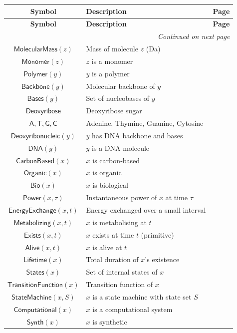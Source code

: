 \documentclass{amsart}
\newenvironment{glossarytable}{%
	\renewcommand{\arraystretch}{1.3}%
	\setlength{\tabcolsep}{4pt}%
	\begin{longtable}{|c|l|c|}
		\hline
		\textbf{Symbol} & \textbf{Description} & \textbf{Page} \\
		\hline
		\endfirsthead
		\hline
		\textbf{Symbol} & \textbf{Description} & \textbf{Page} \\
		\hline
		\endhead
		\hline
		\multicolumn{3}{r}{\textit{Continued on next page}} \\
		\endfoot
		\hline
		\endlastfoot
	}{%
	\end{longtable}%
}
\theoremstyle{break}
\newcommand{\IsBiological}[1]{\mathsf{Bio}(#1)}
\newcommand{\IsSynthetic}[1]{\mathsf{Synth}(#1)}
\begin{document}
\begin{glossarytable}
	$\mathsf{MolecularMass}(z)$ & Mass of molecule $z$ (Da) & \pageref{def:molecularmass} \\
	$\mathsf{Monomer}(z)$ & $z$ is a monomer & \pageref{def:monomer} \\
	$\mathsf{Polymer}(y)$ & $y$ is a polymer & \pageref{def:polymer} \\
	$\mathsf{Backbone}(y)$ & Molecular backbone of $y$ & \pageref{def:backbone} \\
	$\mathsf{Bases}(y)$ & Set of nucleobases of $y$ & \pageref{def:bases} \\
	$\mathsf{Deoxyribose}$ & Deoxyribose sugar & \pageref{def:deoxyribose} \\
	$\mathsf{A},\mathsf{T},\mathsf{G},\mathsf{C}$ & Adenine, Thymine, Guanine, Cytosine & \pageref{def:adenine} \\
	$\mathsf{Deoxyribonucleic}(y)$ & $y$ has DNA backbone and bases & \pageref{def:deoxyribonucleic} \\
	$\mathsf{DNA}(y)$ & $y$ is a DNA molecule & \pageref{def:dna} \\
	
	$\mathsf{CarbonBased}(x)$ & $x$ is carbon‑based & \pageref{def:carbonbased} \\
	$\mathsf{Organic}(x)$ & $x$ is organic & \pageref{def:organic} \\
	$\IsBiological{x}$ & $x$ is biological & \pageref{def:bio} \\
	
	$\mathsf{Power}(x,\tau)$ & Instantaneous power of $x$ at time $\tau$ & \pageref{def:power} \\
	$\mathsf{EnergyExchange}(x,t)$ & Energy exchanged over a small interval & \pageref{def:energyexchange} \\
	$\mathsf{Metabolizing}(x,t)$ & $x$ is metabolising at $t$ & \pageref{def:metabolizing} \\
	$\mathsf{Exists}(x,t)$ & $x$ exists at time $t$ (primitive) & \pageref{def:exists} \\
	$\mathsf{Alive}(x,t)$ & $x$ is alive at $t$ & \pageref{def:alive} \\
	$\mathsf{Lifetime}(x)$ & Total duration of $x$'s existence & \pageref{def:lifetime} \\
	
	$\mathsf{States}(x)$ & Set of internal states of $x$ & \pageref{def:states} \\
	$\mathsf{TransitionFunction}(x)$ & Transition function of $x$ & \pageref{def:transitionfunction} \\
	$\mathsf{StateMachine}(x,S)$ & $x$ is a state machine with state set $S$ & \pageref{def:statemachine} \\
	$\mathsf{Computational}(x)$ & $x$ is a computational system & \pageref{def:computational} \\
	$\IsSynthetic{x}$ & $x$ is synthetic & \pageref{def:synth} \\
	

\end{glossarytable}
\end{document}
